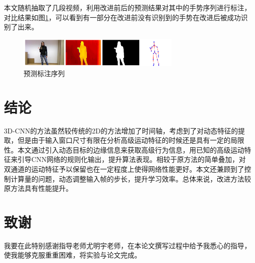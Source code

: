 \documentclass[a4paper, 12pt]{article}
\begin{document}
本文随机抽取了几段视频，利用改进前后的预测结果对其中的手势序列进行标注，对比结果如图\ref{fig:11}，可以看到有一部分在改进前没有识别到的手势在改进后被成功识别了出来。
\begin{figure}[ht]
  \centering
  \includegraphics[width=8cm]{dataVisual.png}
  \caption{\label{fig:11}预测标注序列}
\end{figure}


\section{结论}
3D-CNN的方法虽然较传统的2D的方法增加了时间轴，考虑到了对动态特征的提取，但是由于输入窗口尺寸有限在分析高级运动特征的时候还是具有一定的局限性。本文通过引入动态目标的边缘信息来获取高级行为信息，用已知的高级运动特征来引导CNN网络的规则化输出，提升算法表现。相较于原方法的简单叠加，对双通道的运动特征予以保留也在一定程度上使得网络性能更好。本文还兼顾到了控制计算量的问题，动态调整输入帧的步长，提升学习效率。总体来说，改进方法较原方法具有性能提升。

\section*{致谢}
我要在此特别感谢指导老师尤明宇老师，在本论文撰写过程中给予我悉心的指导，使我能够克服重重困难，将实验与论文完成。



\end{document}
